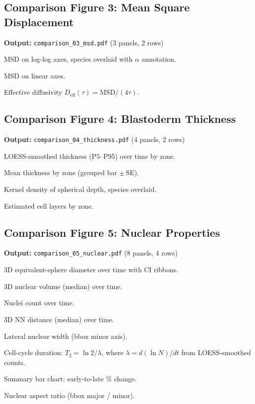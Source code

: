 \documentclass[11pt,a4paper]{article}
\begin{document}
\subsection*{Comparison Figure 3: Mean Square Displacement}

\noindent\textbf{Output:} \texttt{comparison\_03\_msd.pdf}
(3 panels, 2 rows)

\begin{description}[style=nextline,leftmargin=1.5cm]
  \item[3a] MSD on log-log axes, species overlaid with $\alpha$ annotation.
  \item[3b] MSD on linear axes.
  \item[3c] Effective diffusivity $D_\mathrm{eff}(\tau)=\mathrm{MSD}/(4\tau)$.
\end{description}


\subsection*{Comparison Figure 4: Blastoderm Thickness}

\noindent\textbf{Output:} \texttt{comparison\_04\_thickness.pdf}
(4 panels, 2 rows)

\begin{description}[style=nextline,leftmargin=1.5cm]
  \item[4a] LOESS-smoothed thickness (P5--P95) over time by zone.
  \item[4b] Mean thickness by zone (grouped bar $\pm$\,SE).
  \item[4c] Kernel density of spherical depth, species overlaid.
  \item[4d] Estimated cell layers by zone.
\end{description}


\subsection*{Comparison Figure 5: Nuclear Properties}

\noindent\textbf{Output:} \texttt{comparison\_05\_nuclear.pdf}
(8 panels, 4 rows)

\begin{description}[style=nextline,leftmargin=1.5cm]
  \item[5a] 3D equivalent-sphere diameter over time with CI ribbons.
  \item[5b] 3D nuclear volume (median) over time.
  \item[5c] Nuclei count over time.
  \item[5d] 3D NN distance (median) over time.
  \item[5e] Lateral nuclear width (bbox minor axis).
  \item[5f] Cell-cycle duration:
    $T_2 = \ln 2 / \lambda$, where
    $\lambda = d(\ln N)/dt$ from LOESS-smoothed counts.
  \item[5g] Summary bar chart: early-to-late \% change.
  \item[5h] Nuclear aspect ratio (bbox major / minor).
\end{description}
\end{document}
